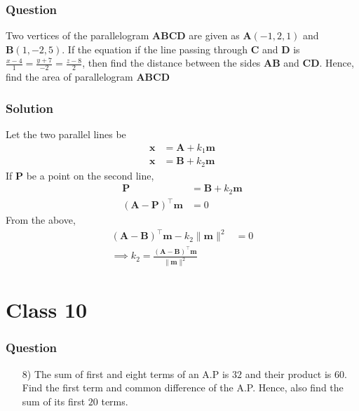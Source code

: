 \documentclass{beamer}
\providecommand{\brak}[1]{\ensuremath{\left(#1\right)}}
\theoremstyle{remark}
\providecommand{\norm}[1]{\lVert#1\rVert}
\let\vec\mathbf
\begin{document}
\begin{frame}
\frametitle{Question }
Two vertices of the parallelogram $\vec{ABCD}$ are given as $\vec{A}\brak{-1,2,1}$ and $\vec{B}\brak{1,-2,5}$. If the equation if the line passing through $\vec{C}$ and $\vec{D}$ is $\frac{x-4}{1} = \frac{y+7}{-2} = \frac{z-8}{2}$, then find the distance between the sides $\vec{AB}$ and $\vec{CD}$. Hence, find the area of parallelogram $\vec{ABCD}$
\end{frame}
%
\begin{frame}
\frametitle{Solution}
Let  the two parallel lines be
\begin{align}
    \vec{x} & = \vec{A} + k_1\vec{m}  \\
    \vec{x} &=  \vec{B} + k_2\vec{m} 
\end{align}
If $\vec{P}$ be a point on the second line, 
\begin{align}
    \vec{P} &=  \vec{B} + k_2\vec{m} 
    \\
	\brak{\vec{A}-\vec{P}}^{\top}\vec{m} &= 0
\end{align}
From the above, 
\begin{align}
	\brak{\vec{A}-\vec{B}}^{\top}\vec{m} -k_2\norm{\vec{m}}^2&= 0
	\\
	\implies k_2 = \frac{
		\brak{\vec{A}-\vec{B}}^{\top}\vec{m}}{ \norm{\vec{m}}^2}
\end{align}
    
\end{frame}








    \section{Class 10}






\begin{frame}
\frametitle{Question }
\begin{enumerate}
    \item [8)]
The sum of first and eight terms of an A.P is $32$ and their product is $60$. Find the first term and common difference of the A.P. Hence, also find the sum of its first $20$ terms. 
\end{enumerate}
\end{frame}
\end{document}
